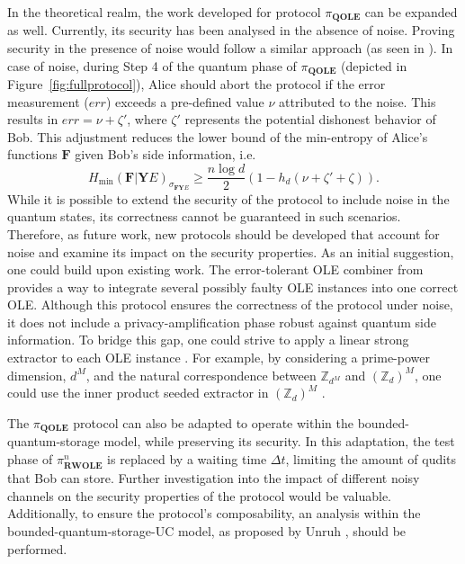 In the theoretical realm, the work developed for protocol $\pi_{\textbf{QOLE}}$ can be expanded as well. Currently, its security has been analysed in the absence of noise. Proving security in the presence of noise would follow a similar approach (as seen in \cite{DFLSS09}). In case of noise, during Step 4 of the quantum phase of $\pi_{\textbf{QOLE}}$ (depicted in Figure~\ref{fig:fullprotocol}), Alice should abort the protocol if the error measurement ($err$) exceeds a pre-defined value $\nu$ attributed to the noise. This results in $err = \nu + \zeta '$, where $\zeta '$ represents the potential dishonest behavior of Bob. This adjustment reduces the lower bound of the min-entropy of Alice's functions $\mathbf{F}$ given Bob's side information, i.e.
$$H_{\min}(\mathbf{F} | \mathbf{Y} E)_{\sigma_{\mathbf{F}\mathbf{Y} E}} \geq \frac{n\log d}{2}\left(1 - h_d(\nu + \zeta ' + \zeta)\right).$$
While it is possible to extend the security of the protocol to include noise in the quantum states, its correctness cannot be guaranteed in such scenarios. Therefore, as future work, new protocols should be developed that account for noise and examine its impact on the security properties. As an initial suggestion, one could build upon existing work. The error-tolerant OLE combiner from \cite{PW08} provides a way to integrate several possibly faulty OLE instances into one correct OLE. Although this protocol ensures the correctness of the protocol under noise, it does not include a privacy-amplification phase robust against quantum side information. To bridge this gap, one could strive to apply a linear strong extractor to each OLE instance \cite{DPV+12}. For example, by considering a prime-power dimension, $d^M$, and the natural correspondence between $\mathbb{Z}_{d^M}$ and $(\mathbb{Z}_d)^M$, one could use the inner product seeded extractor in $(\mathbb{Z}_d)^M$ \cite{KK10}.


The $\pi_{\textbf{QOLE}}$ protocol can also be adapted to operate within the bounded-quantum-storage model, while preserving its security. In this adaptation, the test phase of $\pi^n_{\textbf{RWOLE}}$ is replaced by a waiting time $\Delta t$, limiting the amount of qudits that Bob can store. Further investigation into the impact of different noisy channels on the security properties of the protocol would be valuable. Additionally, to ensure the protocol's composability, an analysis within the bounded-quantum-storage-UC model, as proposed by Unruh \cite{U11}, should be performed.

